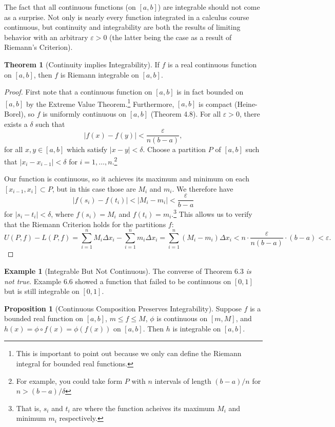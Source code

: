 \documentclass{article}
\theoremstyle{definition}
\newtheorem{proposition}{Proposition}[section]
\newtheorem{theorem}{Theorem}[section]
\newtheorem{example}{Example}[section]
\begin{document}
The fact that all continuous functions (on $ [a,b] $) are integrable should not come as a surprise. Not only is nearly every function integrated in a calculus course continuous, but continuity and integrability are both the results of limiting behavior with an arbitrary $ \varepsilon>0 $ (the latter being the case as a result of Riemann's Criterion). 
\begin{theorem}[Continuity implies Integrability]
If $ f $ is a real continuous function on $ [a,b] $, then $ f $ is Riemann integrable on $ [a,b] $.
\end{theorem}
\begin{proof}
	First note that a continuous function on $ [a,b] $ is in fact bounded on $ [a,b] $ by the Extreme Value Theorem.\footnote{This is important to point out because we only can define the Riemann integral for bounded real functions.} Furthermore, $ [a,b] $ is compact (Heine-Borel), so $ f $ is uniformly continuous on $ [a,b] $ (Theorem 4.8). For all $ \varepsilon>0 $, there exists a $ \delta $ such that $$|f(x)-f(y)|<\frac{\varepsilon}{n(b-a)} ,$$ for all $ x,y\in[a,b] $ which satisfy $ |x-y|<\delta $. Choose a partition  $ P $ of $ [a,b] $ such that $|x_i-x_{i-1}|<\delta $ for $ i=1,\ldots, n$.\footnote{For example, you could take form $ P $ with $ n $ intervals of length $ (b-a)/n $ for $ n>(b-a)/\delta $} 
	
	Our function is continuous, so it achieves its maximum and minimum on each $ [x_{i-1},x_{i}]\subset P $, but in this case those are $ M_i $ and $ m_i $. We therefore have $$|f(s_i)-f(t_i)|<|M_i-m_i|<\frac{\varepsilon}{b-a} $$ for $ |s_i-t_i|<\delta $, where $ f(s_i)=M_i $ and $ f(t_i)=m_i $.\footnote{That is, $ s_i $ and $ t_i $ are where the function acheives its maximum $ M_i $ and minimum $ m_i $ respectively.} This allows us to verify that the Riemann Criterion holds for the partitions $ f $: $$ U(P,f)-L(P,f)=\sum_{i=1}^nM_i\Delta x_i-\sum_{i=1}^nm_i\Delta x_i=\sum_{i=1}^n(M_i-m_i)\Delta x_i<n\cdot\frac{\varepsilon}{n(b-a)}\cdot(b-a)<\varepsilon.$$
\end{proof}
\begin{example}[Integrable But Not Continuous]
	The converse of Theorem 6.3 \textit{is not true}. Example 6.6 showed a function that failed to be continuous on $ [0,1] $ but is still integrable on $ [0,1] $. 
\end{example}
\begin{proposition}[Continuous Composition Preserves Integrability]
Suppose $ f $ is a bounded real function on $ [a,b] $, $ m\le f\le M $, $ \phi $ is continuous on $ [m,M] $, and $ h(x)=\phi\circ f(x)=\phi(f(x)) $ on $ [a,b] $. Then $ h $ is integrable on $ [a,b] $.
\end{proposition}
\end{document}

